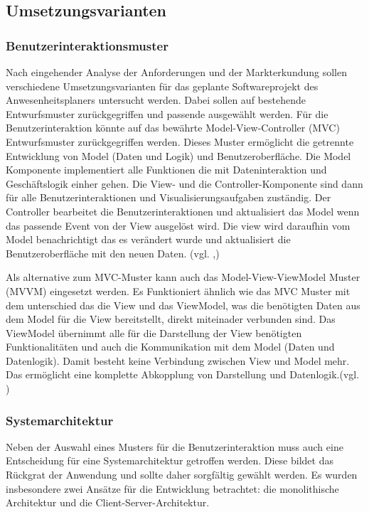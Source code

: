 \subsection{Umsetzungsvarianten}
\label{sec:Umsetzungsvarianten}


\subsubsection{Benutzerinteraktionsmuster}
\label{sec:Benutzerinteraktionsmuster}
Nach eingehender Analyse der Anforderungen und der Markterkundung sollen verschiedene Umsetzungsvarianten für das geplante Softwareprojekt des Anwesenheitsplaners untersucht werden. Dabei sollen auf bestehende Entwurfsmuster zurückgegriffen und passende ausgewählt werden. Für die Benutzerinteraktion könnte auf das bewährte Model-View-Controller (MVC) Entwurfsmuster zurückgegriffen werden. Dieses Muster ermöglicht die getrennte Entwicklung von Model (Daten und Logik) und Benutzeroberfläche. Die Model Komponente implementiert alle Funktionen die mit Dateninteraktion und Geschäftslogik einher gehen. Die View- und die Controller-Komponente sind dann für alle Benutzerinteraktionen und Visualisierungsaufgaben zuständig. Der Controller bearbeitet die Benutzerinteraktionen und aktualisiert das Model wenn das passende Event von der View ausgelöst wird. Die view wird daraufhin vom Model benachrichtigt das es verändert wurde und aktualisiert die Benutzeroberfläche mit den neuen Daten. (vgl. \cite[S. 847 - 857]{goll2011},\cite{MVC})

Als alternative zum MVC-Muster kann auch das Model-View-ViewModel Muster (MVVM) eingesetzt werden. Es Funktioniert ähnlich wie das MVC Muster mit dem unterschied das die View und das ViewModel, was die benötigten Daten aus dem Model für die View bereitstellt, direkt miteinader verbunden sind. Das ViewModel übernimmt alle für die Darstellung der View benötigten Funktionalitäten und auch die Kommunikation mit dem Model (Daten und Datenlogik). Damit besteht keine Verbindung zwischen View und Model mehr. Das ermöglicht eine komplette Abkopplung von Darstellung und Datenlogik.(vgl. \cite{MVVM})

\subsubsection{Systemarchitektur}
\label{sec:Systemarchitektur}
Neben der Auswahl eines Musters für die Benutzerinteraktion muss auch eine Entscheidung für eine Systemarchitektur getroffen werden. Diese bildet das Rückgrat der Anwendung und sollte daher sorgfältig gewählt werden. Es wurden insbesondere zwei Ansätze für die Entwicklung betrachtet: die monolithische Architektur und die Client-Server-Architektur.


